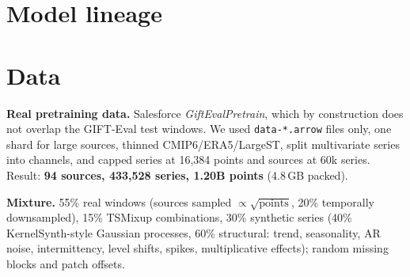 \documentclass[10pt,a4paper]{extarticle}
\newcommand{\code}[1]{\texttt{\small #1}}
\begin{document}
\section{Model lineage}
\begin{table}[H]
\centering\small
\caption{All models trained in this project. Parameters are counted from the saved checkpoints.}
\label{tab:lineage}
\setlength{\tabcolsep}{4pt}
\end{table}

\section{Data}
\textbf{Real pretraining data.} Salesforce \emph{GiftEvalPretrain}, which by construction does not overlap the GIFT-Eval
test windows. We used \code{data-*.arrow} files only, one shard for large sources, thinned CMIP6/ERA5/LargeST, split
multivariate series into channels, and capped series at 16{,}384 points and sources at 60k series. Result:
\textbf{94 sources, 433{,}528 series, 1.20B points} (4.8\,GB packed).

\textbf{Mixture.} 55\% real windows (sources sampled $\propto\sqrt{\text{points}}$, 20\% temporally downsampled),
15\% TSMixup combinations, 30\% synthetic series (40\% KernelSynth-style Gaussian processes, 60\% structural:
trend, seasonality, AR noise, intermittency, level shifts, spikes, multiplicative effects); random missing blocks and
patch offsets.
\end{document}
